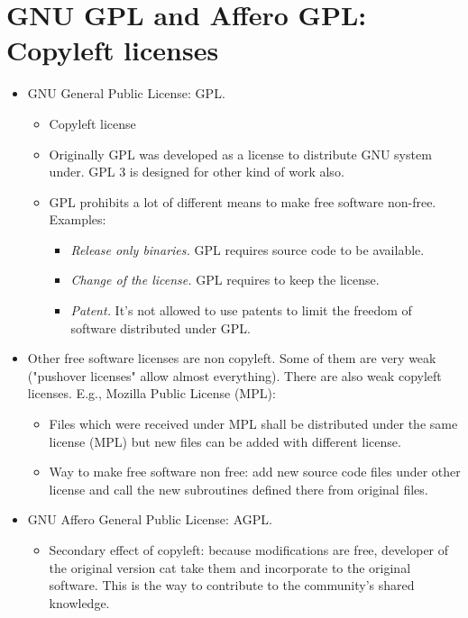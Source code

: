 \documentclass[twoside,openright]{report}
\newcommand{\addnom}[2]{\nomenclature{#1}{#2}}
\begin{document}
\section{GNU GPL and Affero GPL: Copyleft licenses}
\begin{itemize}
 \item     GNU General Public License: GPL.
\begin{itemize}
 \item         Copyleft license
 \item         Originally GPL was developed as a license to distribute GNU system under. GPL 3 is designed for other kind of work also.
 \item         GPL prohibits a lot of different means to make free software non-free. Examples:
\begin{itemize}
 \item             \emph{Release only binaries.} GPL requires source code to be available.
 \item             \emph{Change of the license.} GPL requires to keep the license.
 \item             \emph{Patent.} It's not allowed to use patents to limit the freedom of software distributed under GPL.
\end{itemize}
\end{itemize}
 \item     Other free software licenses are non copyleft. Some of them are very weak ("pushover licenses" allow almost everything). There are also weak copyleft licenses. E.g., Mozilla Public License (MPL):
\begin{itemize}
 \item         Files which were received under MPL shall be distributed under the same license (MPL) but new files can be added with different license.
\addnom{MPL}{Mozilla Public License}
 \item         Way to make free software non free: add new source code files under other license and call the new subroutines defined there from original files.
\end{itemize}
 \item     GNU Affero General Public License: AGPL.
\begin{itemize}
 \item         Secondary effect of copyleft: because modifications are free, developer of the original version cat take them and incorporate to the original software. This is the way to contribute to the community's shared knowledge.

\end{itemize}
\end{itemize}
\end{document}
